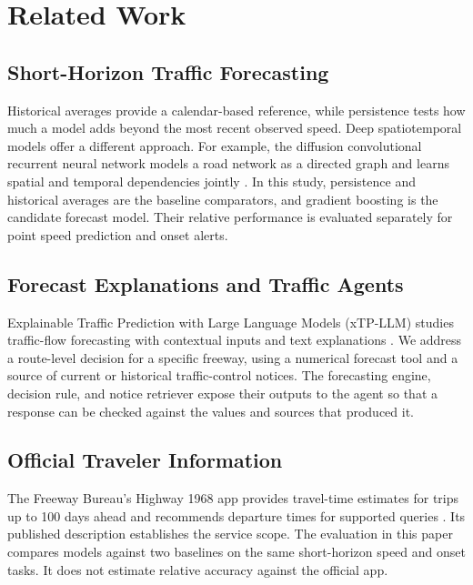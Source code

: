 \section{Related Work}
\subsection{Short-Horizon Traffic Forecasting}
Historical averages provide a calendar-based reference, while persistence tests how much a model adds beyond the most recent observed speed. Deep spatiotemporal models offer a different approach. For example, the diffusion convolutional recurrent neural network models a road network as a directed graph and learns spatial and temporal dependencies jointly \cite{li2018dcrnn}. In this study, persistence and historical averages are the baseline comparators, and gradient boosting is the candidate forecast model. Their relative performance is evaluated separately for point speed prediction and onset alerts.

\subsection{Forecast Explanations and Traffic Agents}
Explainable Traffic Prediction with Large Language Models (xTP-LLM) studies traffic-flow forecasting with contextual inputs and text explanations \cite{xtpllm}. We address a route-level decision for a specific freeway, using a numerical forecast tool and a source of current or historical traffic-control notices. The forecasting engine, decision rule, and notice retriever expose their outputs to the agent so that a response can be checked against the values and sources that produced it.

\subsection{Official Traveler Information}
The Freeway Bureau's Highway 1968 app provides travel-time estimates for trips up to 100 days ahead and recommends departure times for supported queries \cite{fwb1968}. Its published description establishes the service scope. The evaluation in this paper compares models against two baselines on the same short-horizon speed and onset tasks. It does not estimate relative accuracy against the official app.
